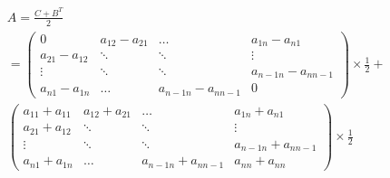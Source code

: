 \documentclass[dvipdfmx,uplatex]{jsarticle}
\begin{document}
  \begin{equation}
    \begin{aligned}
        &A = \frac{C + B^{T}}{2} \nonumber\\
        &= \left(
          \begin{array}{cccc}
          0 & a_{12} - a_{21} & \ldots & a_{1n} - a_{n1} \\
          a_{21} - a_{12} & \ddots & \ddots & \vdots \\
          \vdots & \ddots & \ddots & a_{n-1n} - a_{nn-1} \\
          a_{n1} - a_{1n} & \ldots & a_{n-1n} - a_{nn-1} & 0
          \end{array}
          \right) \times \frac{1}{2} + \nonumber\\ 
          &\left(
            \begin{array}{cccc}
            a_{11} + a_{11} & a_{12} + a_{21} & \ldots & a_{1n} + a_{n1} \\
            a_{21} + a_{12} & \ddots & \ddots & \vdots \\
            \vdots & \ddots & \ddots & a_{n-1n} + a_{nn-1} \\
            a_{n1} + a_{1n} & \ldots & a_{n-1n} + a_{nn-1} & a_{nn} + a_{nn}
            \end{array}
            \right) \times \frac{1}{2} \nonumber\\
    \end{aligned}
  \end{equation}
\end{document}
